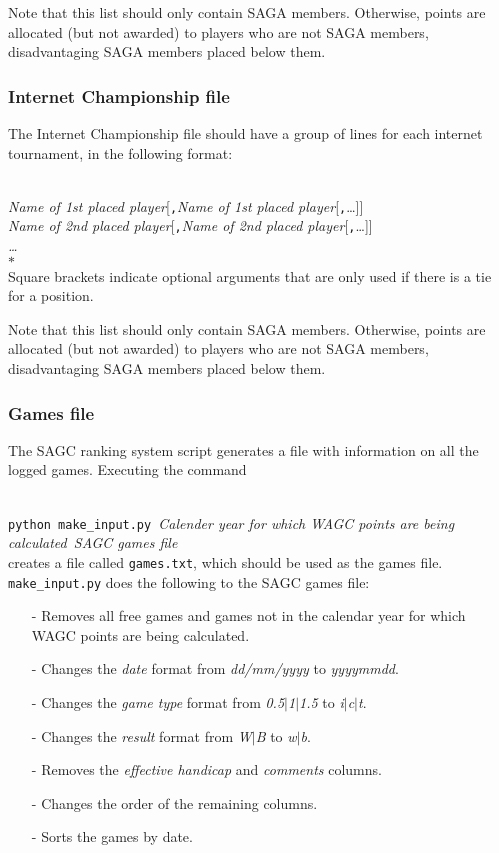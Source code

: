 \documentclass{article}
\begin{document}
Note that this list should only contain SAGA members.  Otherwise, points are allocated (but not awarded) to players who are not SAGA members,
disadvantaging SAGA members placed below them.

\subsubsection{Internet Championship file}
The Internet Championship file should have a group of lines for each internet tournament, in the following format:

\noindent\\
\emph{\flq Name of 1st placed player\frq}[\texttt{,}\emph{\flq Name of 1st placed player\frq}[\texttt{,}\ldots]]\\
\emph{\flq Name of 2nd placed player\frq}[\texttt{,}\emph{\flq Name of 2nd placed player\frq}[\texttt{,}\ldots]]\\
\emph{\flq \ldots\frq}\\
$*$\\

Square brackets indicate optional arguments that are only used if there is a tie for a position.

Note that this list should only contain SAGA members.  Otherwise, points are allocated (but not awarded) to players who are not SAGA members,
disadvantaging SAGA members placed below them.

\subsubsection{Games file}
The SAGC ranking system script generates a file with information on all the logged games. Executing the command

\noindent\\
\texttt{python make\_input.py}\emph{\ \flq Calender year for which WAGC points are being calculated\frq\ \flq SAGC games file\frq}\\

creates a file called \texttt{games.txt}, which should be used as the games file. \texttt{make\_input.py} does the following to the 
SAGC games file:
\begin{itemize}
\item[-] Removes all free games and games not in the calendar year for which WAGC points are being calculated.
\item[-] Changes the \emph{date} format from \emph{dd/mm/yyyy} to \emph{yyyymmdd}.
\item[-] Changes the \emph{game type} format from \emph{0.5$\vert$1$\vert$1.5} to \emph{i$\vert$c$\vert$t}.
\item[-] Changes the \emph{result} format from \emph{W$\vert$B} to \emph{w$\vert$b}.
\item[-] Removes the \emph{effective handicap} and \emph{comments} columns.
\item[-] Changes the order of the remaining columns.
\item[-] Sorts the games by date.
\end{itemize}
\end{document}
